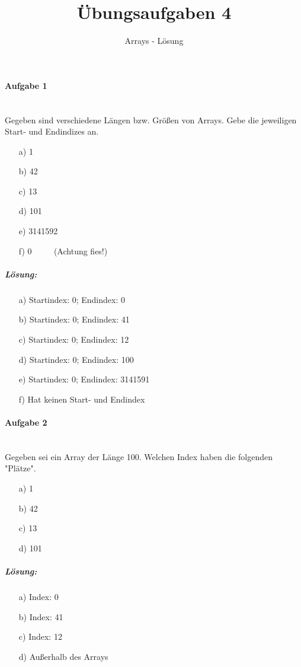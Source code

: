 \documentclass[12pt,a4paper,ngerman]{scrartcl}
\title{Übungsaufgaben 4}
\subtitle{Arrays - Lösung}
\date{}
\begin{document}
	\maketitle
	
	\paragraph{Aufgabe 1}\mbox{}\\
	Gegeben sind verschiedene Längen bzw. Größen von Arrays. Gebe die jeweiligen Start- und Endindizes an.
	
	\begin{itemize}
		\item[a)] 1
		\item[b)] 42
		\item[c)] 13
		\item[d)] 101
		\item[e)] 3141592
		\item[f)] 0 $\qquad$ (Achtung fies!)
	\end{itemize}
	
	\subparagraph{Lösung:}
	\begin{itemize}
		\item[a)] Startindex: 0; Endindex: 0
		\item[b)] Startindex: 0; Endindex: 41
		\item[c)] Startindex: 0; Endindex: 12
		\item[d)] Startindex: 0; Endindex: 100
		\item[e)] Startindex: 0; Endindex: 3141591
		\item[f)] Hat keinen Start- und Endindex
	\end{itemize}
	
	\paragraph{Aufgabe 2}\mbox{}\\
	Gegeben sei ein Array der Länge 100. Welchen Index haben die folgenden "Plätze".
	
	\begin{itemize}
		\item[a)] 1
		\item[b)] 42
		\item[c)] 13
		\item[d)] 101
	\end{itemize}
	
	\subparagraph{Lösung:}
	\begin{itemize}
		\item[a)] Index: 0
		\item[b)] Index: 41
		\item[c)] Index: 12
		\item[d)] Außerhalb des Arrays
	\end{itemize}
	
\end{document}
